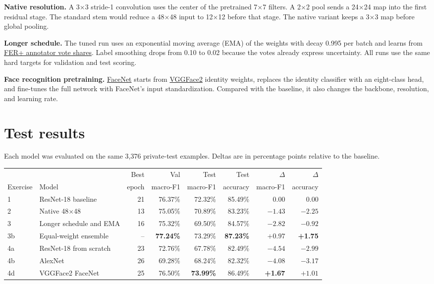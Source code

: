\documentclass[10pt,letterpaper]{article}
\newcommand{\term}[1]{\textbf{#1}}
\newcommand{\sizepx}[1]{#1\ensuremath{\times}#1}
\begin{document}
\term{Native resolution.} A \sizepx{3} stride-1 convolution uses the center of the pretrained \sizepx{7} filters. A \sizepx{2} pool sends a \sizepx{24} map into the first residual stage. The standard stem would reduce a \sizepx{48} input to \sizepx{12} before that stage. The native variant keeps a \sizepx{3} map before global pooling.

\term{Longer schedule.} The tuned run uses an exponential moving average (EMA) of the weights with decay 0.995 per batch and learns from \href{https://arxiv.org/abs/1608.01041}{FER+ annotator vote shares}. Label smoothing drops from 0.10 to 0.02 because the votes already express uncertainty. All runs use the same hard targets for validation and test scoring.

\term{Face recognition pretraining.} \href{https://github.com/timesler/facenet-pytorch}{FaceNet} starts from \href{https://arxiv.org/abs/1710.08092}{VGGFace2} identity weights, replaces the identity classifier with an eight-class head, and fine-tunes the full network with FaceNet's input standardization. Compared with the baseline, it also changes the backbone, resolution, and learning rate.

\newpage
\section{Test results}

Each model was evaluated on the same 3,376 private-test examples. Deltas are in percentage points relative to the baseline.

{\small
\begin{tabularx}{\textwidth}{@{}lYrrrrrr@{}}
\toprule
& & Best & Val & Test & Test & $\Delta$ & $\Delta$\\
Exercise & Model & epoch & macro-F1 & macro-F1 & accuracy & macro-F1 & accuracy\\
  & ResNet-18 baseline      & 21 & 76.37\% & 72.32\% & 85.49\% & 0.00 & 0.00\\
2  & Native \sizepx{48}      & 13 & 75.05\% & 70.89\% & 83.23\% & $-1.43$ & $-2.25$\\
3  & Longer schedule and EMA & 16 & 75.32\% & 69.50\% & 84.57\% & $-2.82$ & $-0.92$\\
3b & Equal-weight ensemble   & -- & \textbf{77.24\%} & 73.29\% & \textbf{87.23\%} & $+0.97$ & \textbf{+1.75}\\
4a & ResNet-18 from scratch  & 23 & 72.76\% & 67.78\% & 82.49\% & $-4.54$ & $-2.99$\\
4b & AlexNet                 & 26 & 69.28\% & 68.24\% & 82.32\% & $-4.08$ & $-3.17$\\
4d & VGGFace2 FaceNet        & 25 & 76.50\% & \textbf{73.99\%} & 86.49\% & \textbf{+1.67} & $+1.01$\\
\bottomrule
\end{tabularx}\par}
\end{document}
